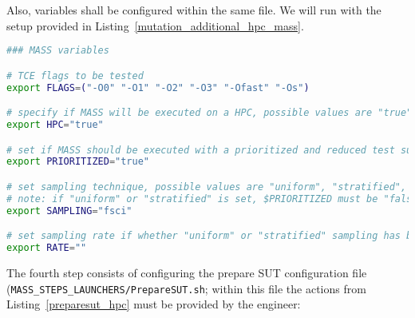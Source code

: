 Also, \MASS variables shall be configured within the same file. We will run \MASS with the setup provided in Listing~\ref{mutation_additional_hpc_mass}. 

\begin{lstlisting}[language=bash, label=mutation_additional_hpc_mass ,caption=\MASS specific variables. Excerpt of mass\_conf.sh file.]
### MASS variables

# TCE flags to be tested 
export FLAGS=("-O0" "-O1" "-O2" "-O3" "-Ofast" "-Os")

# specify if MASS will be executed on a HPC, possible values are "true" or "false"
export HPC="true"

# set if MASS should be executed with a prioritized and reduced test suite
export PRIORITIZED="true"

# set sampling technique, possible values are "uniform", "stratified", and "fsci"
# note: if "uniform" or "stratified" is set, $PRIORITIZED must be "false"
export SAMPLING="fsci"

# set sampling rate if whether "uniform" or "stratified" sampling has been selected
export RATE=""
\end{lstlisting}

The fourth step consists of configuring the prepare SUT configuration file \\(\texttt{MASS\_STEPS\_LAUNCHERS/PrepareSUT.sh}; within this file the actions from Listing~\ref{preparesut_hpc} must be provided by the engineer:

